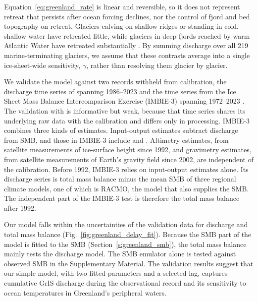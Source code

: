 \documentclass[draft,linenumbers]{agujournal2025}
\begin{document}
Equation~\ref{eq:greenland_rate} is linear and reversible, so it does not represent retreat that persists after ocean forcing declines, nor the control of fjord and bed topography on retreat. Glaciers calving on shallow ridges or standing in cold, shallow water have retreated little, while glaciers in deep fjords reached by warm Atlantic Water have retreated substantially \citep{Wood2021}. By summing discharge over all 219 marine-terminating glaciers, we assume that these contrasts average into a single ice-sheet-wide sensitivity, $\gamma$, rather than resolving them glacier by glacier.

We validate the model against two records withheld from calibration, the discharge time series of \citet{Mankoff2021} spanning 1986--2023 and the time series from the Ice Sheet Mass Balance Intercomparison Exercise (IMBIE-3) spanning 1972--2023 \citep{Otosaka2026}. The validation with \citet{Mankoff2021} is informative but weak, because that time series shares its underlying raw data with the \citet{Mouginot2019} calibration and differs only in processing. IMBIE-3 combines three kinds of estimates. Input-output estimates subtract discharge from SMB, and those in IMBIE-3 include \citet{Mouginot2019} and \citet{Mankoff2021}. Altimetry estimates, from satellite measurements of ice-surface height since 1992, and gravimetry estimates, from satellite measurements of Earth's gravity field since 2002, are independent of the calibration. Before 1992, IMBIE-3 relies on input-output estimates alone. Its discharge series is total mass balance minus the mean SMB of three regional climate models, one of which is RACMO, the model that also supplies the \citet{Mouginot2019} SMB. The independent part of the IMBIE-3 test is therefore the total mass balance after 1992.

Our model falls within the uncertainties of the validation data for discharge and total mass balance (Fig.~\ref{fig:greenland_delay_fit}). Because the SMB part of the model is fitted to the \citet{Mouginot2019} SMB (Section~\ref{s:greenland_smb}), the total mass balance mainly tests the discharge model. The SMB emulator alone is tested against observed SMB in the Supplementary Material. The validation results suggest that our simple model, with two fitted parameters and a selected lag, captures cumulative GrIS discharge during the observational record and its sensitivity to ocean temperatures in Greenland's peripheral waters.
\end{document}
